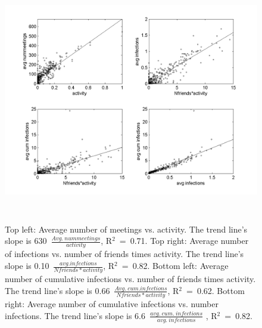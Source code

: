 \begin{figure}
\begin{center}
\includegraphics[width=16cm,height=10cm]{ImportantCorrelations}

\label{ImportantCorrelations}
\caption{Top left: Average number of meetings vs. activity. The trend line's slope is 630~$\frac{Avg.~nummeetings}{activity}$, R$^2$~=~0.71. Top right: Average number of infections vs. number of friends times activity. The trend line's slope is 0.10~$\frac{avg. infections}{Nfriends*activity}$, R$^2$~=~0.82. Bottom left: Average number of cumulative infections vs. number of friends times activity. The trend line's slope is 0.66~$\frac{Avg.~cum. infections}{Nfriends*activity}$, R$^2$~=~0.62. Bottom right: Average number of cumulative infections vs. number infections. The trend line's slope is  6.6~$\frac{avg.~cum.~infections}{avg.~infections}$ , R$^2$~=~0.82.}
\end{center}
\end{figure}




